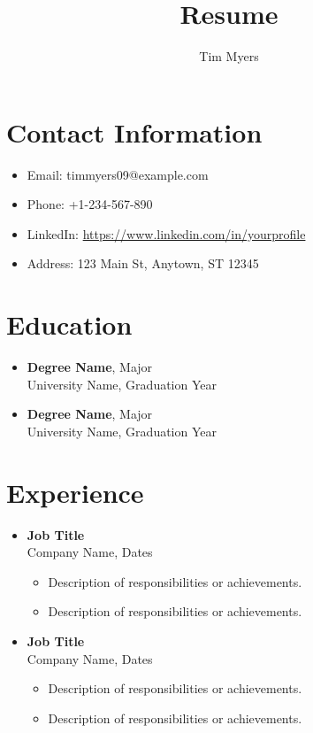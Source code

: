 \documentclass[a4paper,10pt]{article}
\title{Resume}
\author{Tim Myers}
\date{} %
\begin{document}
\maketitle

\section*{Contact Information}
\begin{itemize}
    \item Email: timmyers09@example.com
    \item Phone: +1-234-567-890
    \item LinkedIn: \url{https://www.linkedin.com/in/yourprofile}
    \item Address: 123 Main St, Anytown, ST 12345
\end{itemize}

\section*{Education}
\begin{itemize}
    \item \textbf{Degree Name}, Major \\
    University Name, Graduation Year
    \item \textbf{Degree Name}, Major \\
    University Name, Graduation Year
\end{itemize}

\section*{Experience}
\begin{itemize}
    \item \textbf{Job Title} \\
    Company Name, Dates \\
    \begin{itemize}
        \item Description of responsibilities or achievements.
        \item Description of responsibilities or achievements.
    \end{itemize}
    
    \item \textbf{Job Title} \\
    Company Name, Dates \\
    \begin{itemize}
        \item Description of responsibilities or achievements.
        \item Description of responsibilities or achievements.
    \end{itemize}
\end{itemize}
\end{document}
